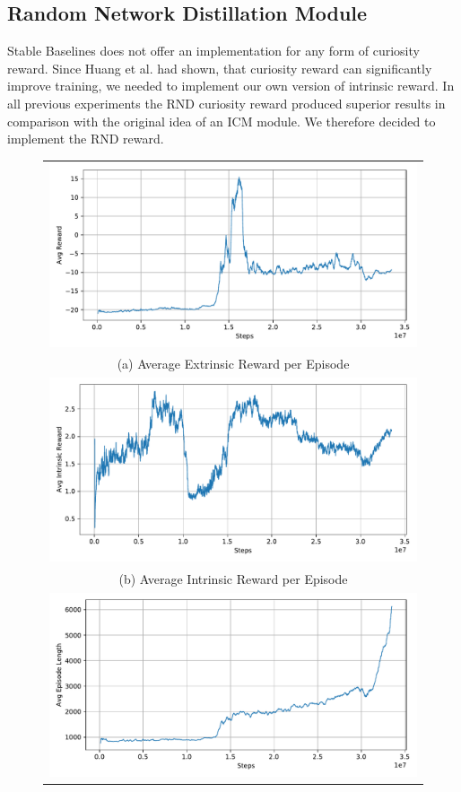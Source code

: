 \subsection{Random Network Distillation Module} \label{sec:blRND}
Stable Baselines does not offer an implementation for any form of curiosity reward. Since Huang et al. had shown, that curiosity reward can significantly improve training, we needed to implement our own version of intrinsic reward. In all previous experiments the RND curiosity reward produced superior results in comparison with the original idea of an ICM module. We therefore decided to implement the RND reward. 

\begin{figure}[htp]
    \begin{center}
    \begin{tabular}{c}
    \includegraphics[clip, width=0.7\columnwidth]{figures/implementation/rnd_pong_episode_reward.pdf} \\
    {\small (a) Average Extrinsic Reward per Episode} \\
    \addlinespace[0.4cm]
    \includegraphics[clip, width=0.7\columnwidth]{figures/implementation/rnd_pong_episode_intrinsic_reward.pdf} \\
    {\small (b) Average Intrinsic Reward per Episode} \\
    \addlinespace[0.4cm]
    \includegraphics[clip, width=0.7\columnwidth]{figures/implementation/rnd_pong_episode_length.pdf} \\

\end{tabular}
\end{center}
\end{figure}
